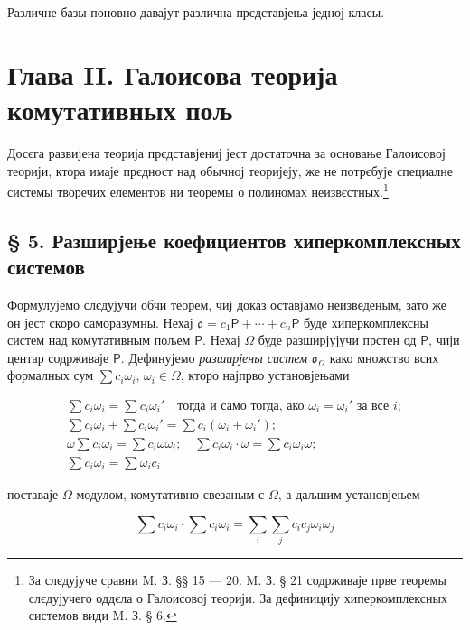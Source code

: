 \documentclass[11pt]{article}
\newcommand{\srcfn}[2]{\footnote{#2}}
\begin{document}
Различне базы поновно давајут различна прєдставјења једној класы.

\section*{Глава II. Галоисова теорија комутативных пољ}\label{kapitel-ii.-galoissche-theorie-kommutativer-koerper}

Досєга развијена теорија прєдставјениј јест достаточна за основање Галоисовој теорији, ктора имаје прєдност над обычној теоријеју, же не потрєбује специалне системы творечих елементов ни теоремы о полиномах неизвєстных.\srcfn{1}{За слєдујуче сравни M. З. §§ 15 --- 20. M. З. § 21 содрживаје прве теоремы слєдујучего оддєла о Галоисовој теорији. За дефиницију хиперкомплексных системов види M. З. § 6.}

\subsection*{§ 5. Разширјење коефициентов хиперкомплексных системов}\label{koeffizientenerweiterung-hyperkomplexer-systeme}

Формулујемо слєдујучи обчи теорем, чиј доказ оставјамо неизведеным, зато же он јест скоро саморазумны. Нехај \(\mathfrak{o}=c_1\mathsf P+\cdots+c_n\mathsf P\) буде хиперкомплексны систем над комутативным пољем \(\mathsf P\). Нехај \(\Omega\) буде разширјујучи прстен од \(\mathsf P\), чији центар содрживаје \(\mathsf P\). Дефинујемо \emph{разширјены систем} \(\mathfrak{o}_{\Omega}\) како множство всих формалных сум \(\sum c_i\omega_i\), \(\omega_i\in\Omega\), кторо најпрво установјењами

\[
\begin{array}{l}
\sum c_i\omega_i=\sum c_i\omega_i' \quad\text{тогда и само тогда, ако } \omega_i=\omega_i' \text{ за все } i;\\
\sum c_i\omega_i+\sum c_i\omega_i'=\sum c_i(\omega_i+\omega_i');\\
\omega\sum c_i\omega_i=\sum c_i\omega\omega_i;\quad
\sum c_i\omega_i\cdot\omega=\sum c_i\omega_i\omega;\\
\sum c_i\omega_i=\sum \omega_i c_i
\end{array}
\]

поставаје \(\Omega\)-модулом, комутативно свезаным с \(\Omega\), а даљшим установјењем

\[
\sum c_i\omega_i\cdot \sum c_i\omega_i
=\sum_i\sum_j c_ic_j\omega_i\omega_j
\]
\end{document}
